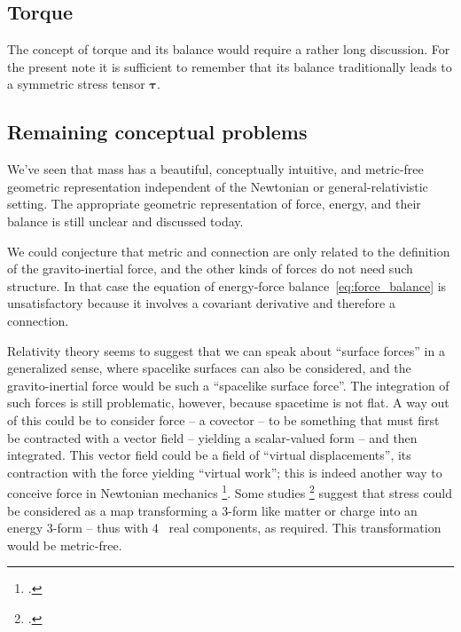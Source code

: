 \documentclass[\ifafour a4paper,12pt,\else a5paper,10pt,\fi%
onecolumn,oneside,article,%
british%
]{memoir}
\theoremstyle{remark}
\theoremstyle{innote}
\newcommand*{\citep}{\footcites}%
\newcommand*{\de}{\partialup}%
\renewcommand*{\|}{\nonscript\,\vert\nonscript\;\mathopen{}}
\newcommand*{\sect}{\S}%
\newcommand*{\Li}{\mathrm{L}}
\newcommand*{\yqq}{q}
\newcommand*{\yq}{\bm{\yqq}}
\newcommand*{\yTT}{\tau}
\newcommand*{\yT}{\bm{\yTT}}
\newcommand*{\yvvt}{v}
\newcommand*{\yvt}{\bm{\yvvt}}
\newcommand*{\yFF}{U}
\newcommand*{\yF}{\bm{\yFF}}
\newcommand*{\yFi}{\yF^{\mathord{\star}}}
\newcommand*{\yff}{f}
\newcommand*{\yf}{\bm{\yff}}
\newcommand*{\ye}{\epsilon}
\newcommand*{\ynab}{\nabla}
\begin{document}



\subsection{Torque}

The concept of torque and its balance would require a rather long
discussion. For the present note it is sufficient to remember that its
balance traditionally leads to a symmetric stress tensor $\yT$.


\subsection{Remaining conceptual problems}
\label{sec:conceptual_problems_stress}

We've seen that mass has a beautiful, conceptually intuitive, and
metric-free geometric representation independent of the Newtonian or
general-relativistic setting. The appropriate geometric representation of
force, energy, and their balance is still unclear and discussed today.

We could conjecture that metric and connection are only related to the
definition of the gravito-inertial force, and the other kinds of forces do
not need such structure. In that case the equation of
energy-force balance~\eqref{eq:force_balance} is unsatisfactory because it
involves a covariant derivative and therefore a connection.

Relativity theory seems to suggest that we can speak about \enquote{surface
  forces} in a generalized sense, where spacelike surfaces can also be
considered, and the gravito-inertial force would be such a
\enquote{spacelike surface force}. The integration of such forces is still
problematic, however, because spacetime is not flat. A way out of this
could be to consider force -- a covector -- to be something that must first
be contracted with a vector field -- yielding a scalar-valued form -- and
then integrated. This vector field could be a field of \enquote{virtual
  displacements}, its contraction with the force yielding \enquote{virtual
  work}; this is indeed another way to conceive force in Newtonian
mechanics \citep[\sect~238]{truesdelletal1960}. Some studies
\citep{segev2002,hehletal2003,segev1986,segevetal1999,segev2000,segev2000b}
suggest that stress could be considered as a map transforming a 3-form like
matter or charge into an energy 3-form -- thus with 4~ real
components, as required. This transformation would be metric-free.
\end{document}

